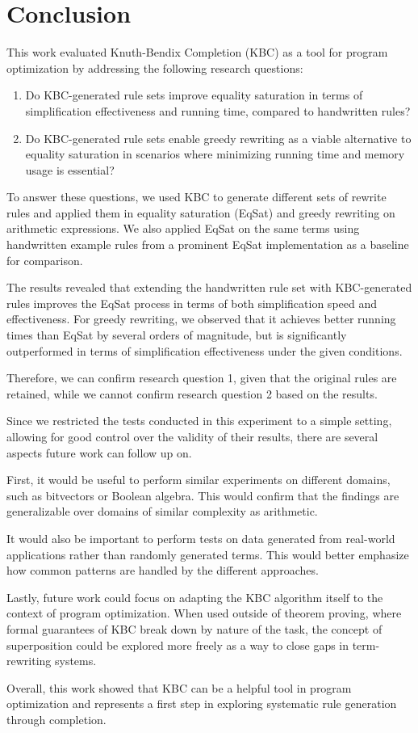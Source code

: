 \chapter{Conclusion}
\label{chap:conclusion}

This work evaluated Knuth-Bendix Completion (KBC) as a tool for program optimization by addressing the following research questions:
\begin{enumerate}
	\item Do KBC-generated rule sets improve equality saturation in terms of simplification effectiveness and running time, compared to handwritten rules?
	\item Do KBC-generated rule sets enable greedy rewriting as a viable alternative to equality saturation in scenarios where minimizing running time and memory usage is essential?
\end{enumerate}

To answer these questions, we used KBC to generate different sets of rewrite rules and applied them in equality saturation (EqSat) and greedy rewriting on arithmetic expressions. We also applied EqSat on the same terms using handwritten example rules from a prominent EqSat implementation as a baseline for comparison.

The results revealed that extending the handwritten rule set with KBC-generated rules improves the EqSat process in terms of both simplification speed and effectiveness. For greedy rewriting, we observed that it achieves better running times than EqSat by several orders of magnitude, but is significantly outperformed in terms of simplification effectiveness under the given conditions. 

Therefore, we can confirm research question 1, given that the original rules are retained, while we cannot confirm research question 2 based on the results.

Since we restricted the tests conducted in this experiment to a simple setting, allowing for good control over the validity of their results, there are several aspects future work can follow up on.

First, it would be useful to perform similar experiments on different domains, such as bitvectors or Boolean algebra. This would confirm that the findings are generalizable over domains of similar complexity as arithmetic.

It would also be important to perform tests on data generated from real-world applications rather than randomly generated terms. This would better emphasize how common patterns are handled by the different approaches.

Lastly, future work could focus on adapting the KBC algorithm itself to the context of program optimization. When used outside of theorem proving, where formal guarantees of KBC break down by nature of the task, the concept of superposition could be explored more freely as a way to close gaps in term-rewriting systems.

Overall, this work showed that KBC can be a helpful tool in program optimization and represents a first step in exploring systematic rule generation through completion.